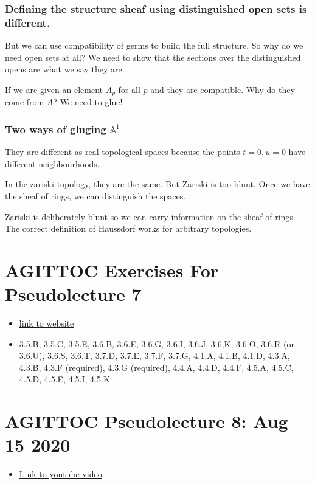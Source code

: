 \documentclass{book}
\newcommand{\A}{\ensuremath{\mathbb{A}}}
\theoremstyle{definition}
\begin{document}
\subsection{Defining the structure sheaf using distinguished open sets is different.}
But we can use compatibility of germs to build the full structure. So why
do we need open sets at all? We need to show that the sections over the
distinguished opens are what we say they are.

If we are given an element $A_p$ for all $p$ and they are compatible.
Why do they come from $A$? We need to glue!

\subsection{Two ways of gluging $\A^1$}
They are different as real topological spaces because the points $t = 0, u = 0$
have different neighbourhoods.

In the zariski topology, they are the same. But Zariski is too blunt. Once
we have the sheaf of rings, we can distinguish the spaces.

Zariski is deliberately blunt so we can carry information on the sheaf of
rings.
The correct definition of Haussdorf works for arbitrary topologies.

\chapter{AGITTOC Exercises For Pseudolecture 7}
\begin{itemize}
\item \href{https://math216.wordpress.com/2017-18-course/#lob}{link to website}
\item 3.5.B, 3.5.C, 3.5.E, 3.6.B, 3.6.E, 3.6.G, 3.6.I, 3.6.J, 3.6,K, 3.6.O, 3.6.R (or 3.6.U), 3.6.S, 3.6.T, 3.7.D, 3.7.E, 3.7.F, 3.7.G, 4.1.A, 4.1.B, 4.1.D, 4.3.A, 4.3.B, 4.3.F (required), 4.3.G (required), 4.4.A, 4.4.D, 4.4.F, 4.5.A, 4.5.C, 4.5.D, 4.5.E, 4.5.I, 4.5.K
\end{itemize}

\chapter{AGITTOC Pseudolecture 8: Aug 15 2020}
\begin{itemize}
\item \href {https://www.youtube.com/watch?v=JZ01Akw52z8}{Link to youtube video}
\end{itemize}
\end{document}
